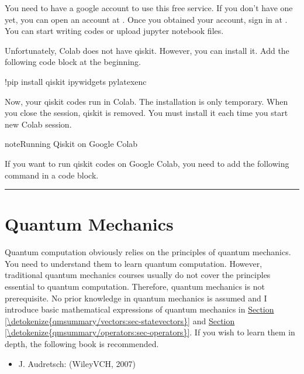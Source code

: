 \documentclass[letterpaper,10pt,english]{jupyterBook}
\begin{document}
\sphinxAtStartPar
You need to have a google account to use this free service. If you don’t have one yet, you can open an account at .  Once you obtained your account, sign in at .  You can start writing codes or upload jupyter notebook files.

\sphinxAtStartPar
Unfortunately, Colab does not have qiskit.  However, you can install it.  Add the following code block at the beginning.

\begin{sphinxVerbatim}[commandchars=\\\{\}]
!pip install qiskit ipywidgets pylatexenc
\end{sphinxVerbatim}

\sphinxAtStartPar
Now, your qiskit codes run in Colab.  The installation is only temporary.  When you close the session, qiskit is removed.  You must install it each time you start new Colab session.

\begin{sphinxadmonition}{note}{Running Qiskit on Google Colab}

\sphinxAtStartPar
If you want to run qiskit codes on Google Colab, you need to add the following command in a code block.

\sphinxAtStartPar
{}
\end{sphinxadmonition}


\bigskip\hrule\bigskip


\sphinxstepscope


\chapter{Quantum Mechanics}
\label{\detokenize{qmsummary/intro:quantum-mechanics}}\label{\detokenize{qmsummary/intro:sec-quantum}}\label{\detokenize{qmsummary/intro::doc}}
\sphinxAtStartPar
Quantum computation obviously relies on the principles of quantum mechanics. You need to understand them to learn quantum computation.  However, traditional quantum mechanics courses usually do not cover the principles essential to quantum computation. Therefore, quantum mechanics is not prerequisite.  No prior knowledge in quantum mechanics is assumed and I introduce basic mathematical expressions of quantum mechanics in \hyperref[\detokenize{qmsummary/vectors:sec-statevectors}]{Section \ref{\detokenize{qmsummary/vectors:sec-statevectors}}} and \hyperref[\detokenize{qmsummary/operators:sec-operators}]{Section \ref{\detokenize{qmsummary/operators:sec-operators}}}.   If you wish to learn them in depth, the following book is recommended.
\begin{itemize}
\item {}
\sphinxAtStartPar
J. Audretsch:  (Wiley\sphinxhyphen{}VCH, 2007)

\end{itemize}
\end{document}
